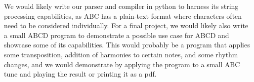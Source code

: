 We would likely write our parser and compiler in python to harness its string processing capabilities, as ABC has a plain-text format where characters often need to be considered individually.
	For a final project, we would likely also write a small ABCD program to demonstrate a possible use case for ABCD and showcase some of its capabilities. This would probably be a program that applies some transposition, addition of harmonies to certain notes, and some rhythm changes, and we would demonstrate by applying the program to a small ABC tune and playing the result or printing it as a pdf.

